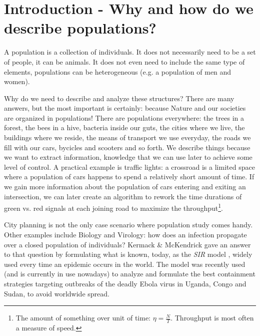 
\chapter[Introduction - Describing populations]{Introduction - Why and how do we describe populations?}
\label{ch:intro}

A population is a collection of individuals. It does not necessarily need
to be a set of people, it can be animals. It does not even need to include the
same type of elements, populations can be heterogeneous (e.g. a population
of men and women).

Why do we need to describe and analyze these structures? There are many answers,
but the most important is certainly: because Nature and our societies
are organized in populations!
There are populations everywhere:
the trees in a forest, the bees in a hive, bacteria inside our guts,
the cities where we live, the buildings where we reside,
the means of transport we use everyday, the roads we fill with our cars, bycicles and
scooters and so forth. We describe things because we want to extract information, knowledge
that we can use later to achieve some level of control. A practical example is traffic
lights: a crossroad is a limited space where a population of cars happens to spend a
relatively short amount of time.
If we gain more information about the population of cars entering and exiting an
intersection, we can later create an algorithm to rework the time durations of green vs.
red signals at each joining road to maximize the 
throughput\footnote{The amount of something over unit of time: $\eta = \frac{N}{T}$. 
Throughput is most often a measure of speed.}.

City planning is not the only case scenario where population study comes handy. Other
examples include Biology and Virology: how does an infection propagate over a closed
population of individuals? Kermack \& McKendrick \cite{kermack-mckendrick}
gave an answer to that question by formulating what is known, today, as the \textit{SIR} model
\cite{kermack-mckendrick-sir}, widely used every time an epidemic occurs in the world. The
model was recently used (and is currently in use nowadays) to
analyze and formulate the best containment strategies targeting outbreaks of the
deadly Ebola virus \cite{who-ebola} in Uganda, Congo and Sudan, to avoid worldwide spread.

